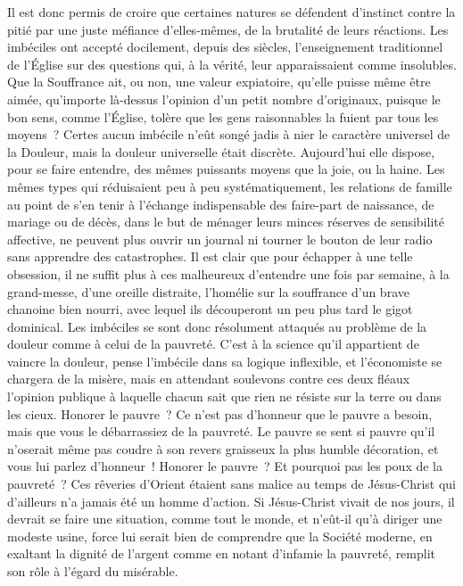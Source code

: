 \documentclass[french,twoside]{book} %
\begin{document}
\noindent Il est donc permis de croire que certaines natures se défendent d’instinct contre la pitié par une juste méfiance d’elles-mêmes, de la brutalité de leurs réactions. Les imbéciles ont accepté docilement, depuis des siècles, l’enseignement traditionnel de l’Église sur des questions qui, à la vérité, leur apparaissaient comme insolubles. Que la Souffrance ait, ou non, une valeur expiatoire, qu’elle puisse même être aimée, qu’importe là-dessus l’opinion d’un petit nombre d’originaux, puisque le bon sens, comme l’Église, tolère que les gens raisonnables la fuient par tous les moyens ? Certes aucun imbécile n’eût songé jadis à nier le caractère universel de la Douleur, mais la douleur universelle était discrète. Aujourd’hui elle dispose, pour se faire entendre, des mêmes puissants moyens que la joie, ou la haine. Les mêmes types qui réduisaient peu à peu systématiquement, les relations de famille au point de s’en tenir à l’échange indispensable des faire-part de naissance, de mariage ou de décès, dans le but de ménager leurs minces réserves de sensibilité affective, ne peuvent plus ouvrir un journal ni tourner le bouton de leur radio sans apprendre des catastrophes. Il est clair que pour échapper à une telle obsession, il ne suffit plus à ces malheureux d’entendre une fois par semaine, à la grand-messe, d’une oreille distraite, l’homélie sur la souffrance d’un brave chanoine bien nourri, avec lequel ils découperont un peu plus tard le gigot dominical. Les imbéciles se sont donc résolument attaqués au problème de la douleur comme à celui de la pauvreté. C’est à la science qu’il appartient de vaincre la douleur, pense l’imbécile dans sa logique inflexible, et l’économiste se chargera de la misère, mais en attendant soulevons contre ces deux fléaux l’opinion publique à laquelle chacun sait que rien ne résiste sur la terre ou dans les cieux. Honorer le pauvre ? Ce n’est pas d’honneur que le pauvre a besoin, mais que vous le débarrassiez de la pauvreté. Le pauvre se sent si pauvre qu’il n’oserait même pas coudre à son revers graisseux la plus humble décoration, et vous lui parlez d’honneur ! Honorer le pauvre ? Et pourquoi pas les poux de la pauvreté ? Ces rêveries d’Orient étaient sans malice au temps de Jésus-Christ qui d’ailleurs n’a jamais été un homme d’action. Si Jésus-Christ vivait de nos jours, il devrait se faire une situation, comme tout le monde, et n’eût-il qu’à diriger une modeste usine, force lui serait bien de comprendre que la Société moderne, en exaltant la dignité de l’argent comme en notant d’infamie la pauvreté, remplit son rôle à l’égard du misérable.\par
\end{document}

